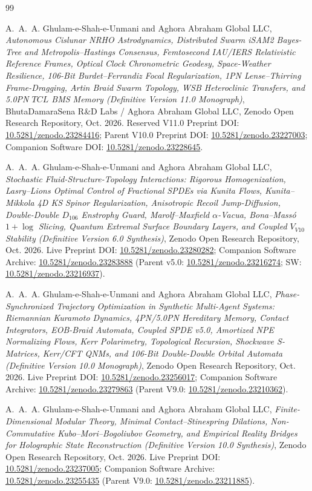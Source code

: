 \documentclass[11pt,a4paper,reqno]{article}
\def\texttt#1{#1}%
\def\mathrm#1{#1}%
\def\mathcal#1{#1}%
\def\mathbb#1{#1}%
\newcommand{\zenodo}[1]{\href{https://doi.org/10.5281/zenodo.#1}{\texttt{10.5281/\allowbreak zenodo.#1}}}
\theoremstyle{plain}
\theoremstyle{definition}
\theoremstyle{remark}
\numberwithin{equation}{section}
\begin{document}
\begin{thebibliography}{99}

A.~A.~A. Ghulam-e-Shah-e-Unmani and {Aghora Abraham Global LLC},
\emph{Autonomous Cislunar NRHO Astrodynamics, Distributed Swarm iSAM2 Bayes-Tree and Metropolis--Hastings Consensus, Femtosecond IAU/IERS Relativistic Reference Frames, Optical Clock Chronometric Geodesy, Space-Weather Resilience, 106-Bit Burdet--Ferrandiz Focal Regularization, 1PN Lense--Thirring Frame-Dragging, Artin Braid Swarm Topology, WSB Heteroclinic Transfers, and 5.0PN $\mathrm{TCL}$ BMS Memory (Definitive Version 11.0 Monograph)},
BhutaDamaraSena R\&D Labs / Aghora Abraham Global LLC, Zenodo Open Research Repository, Oct. 2026.
Reserved V11.0 Preprint DOI: \zenodo{23284416}; Parent V10.0 Preprint DOI: \zenodo{23227003}; Companion Software DOI: \zenodo{23228645}.

A.~A.~A. Ghulam-e-Shah-e-Unmani and {Aghora Abraham Global LLC},
\emph{Stochastic Fluid-Structure-Topology Interactions: Rigorous Homogenization, Lasry--Lions Optimal Control of Fractional SPDEs via Kunita Flows, Kunita--Mikkola 4D KS Spinor Regularization, Anisotropic Recoil Jump-Diffusion, Double-Double $\mathbb{D}_{106}$ Enstrophy Guard, Marolf--Maxfield $\alpha$-Vacua, Bona--Mass\'o $1+\log$ Slicing, Quantum Extremal Surface Boundary Layers, and Coupled $\mathcal{V}_{\mathrm{V10}}$ Stability (Definitive Version 6.0 Synthesis)},
Zenodo Open Research Repository, Oct. 2026.
Live Preprint DOI: \zenodo{23280282}; Companion Software Archive: \zenodo{23283888} (Parent v5.0: \zenodo{23216274}; SW: \zenodo{23216937}).

A.~A.~A. Ghulam-e-Shah-e-Unmani and {Aghora Abraham Global LLC},
\emph{Phase-Synchronized Trajectory Optimization in Synthetic Multi-Agent Systems: Riemannian Kuramoto Dynamics, 4PN/5.0PN Hereditary Memory, Contact Integrators, EOB-Braid Automata, Coupled SPDE v5.0, Amortized NPE Normalizing Flows, Kerr Polarimetry, Topological Recursion, Shockwave S-Matrices, Kerr/CFT QNMs, and 106-Bit Double-Double Orbital Automata (Definitive Version 10.0 Monograph)},
Zenodo Open Research Repository, Oct. 2026.
Live Preprint DOI: \zenodo{23256017}; Companion Software Archive: \zenodo{23279863} (Parent V9.0: \zenodo{23210362}).

A.~A.~A. Ghulam-e-Shah-e-Unmani and {Aghora Abraham Global LLC},
\emph{Finite-Dimensional Modular Theory, Minimal Contact--Stinespring Dilations, Non-Commutative Kubo--Mori--Bogoliubov Geometry, and Empirical Reality Bridges for Holographic State Reconstruction (Definitive Version 10.0 Synthesis)},
Zenodo Open Research Repository, Oct. 2026.
Live Preprint DOI: \zenodo{23237005}; Companion Software Archive: \zenodo{23255435} (Parent V9.0: \zenodo{23211885}).


\end{thebibliography}
\end{document}
